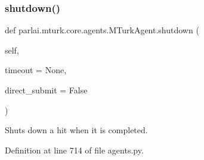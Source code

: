 \mbox{\label{classparlai_1_1mturk_1_1core_1_1agents_1_1MTurkAgent_ad269775afaaa10dba0432080fba99b14}} 
\subsubsection{\texorpdfstring{shutdown()}{shutdown()}}
{\footnotesize\ttfamily def parlai.\+mturk.\+core.\+agents.\+M\+Turk\+Agent.\+shutdown (\begin{DoxyParamCaption}\item[{}]{self,  }\item[{}]{timeout = {\ttfamily None},  }\item[{}]{direct\+\_\+submit = {\ttfamily False} }\end{DoxyParamCaption})}

\begin{DoxyVerb}Shuts down a hit when it is completed.
\end{DoxyVerb}
 

Definition at line 714 of file agents.\+py.


